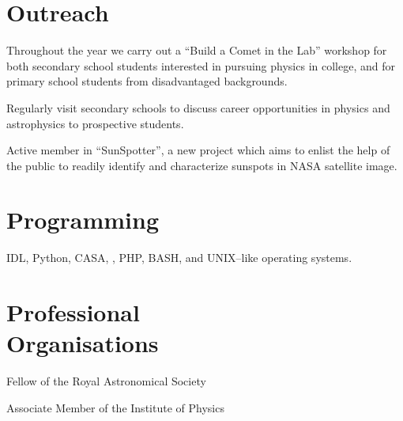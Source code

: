 \documentclass[margin,line]{resume}
\begin{document}
\begin{resume}
    \vspace{4mm}
    \section{\mysidestyle Outreach}

	\begin{list2}
    \item Throughout the year we carry out a ``Build a Comet in the Lab'' workshop for both secondary school students interested in pursuing physics in college, and for primary school students from disadvantaged backgrounds.
    \item Regularly visit secondary schools to discuss career opportunities in physics and astrophysics to prospective students.
        \item Active member in ``SunSpotter'', a new project which aims to enlist the help of the public to readily identify and characterize sunspots in NASA satellite image.\vspace{-1mm}\\%
    \end{list2}


    \vspace{4mm}
    \section{\mysidestyle Programming} 

    IDL, Python, CASA, \LaTeXe, PHP, BASH, and UNIX--like operating systems.


    \vspace{4mm}
    \section{\mysidestyle Professional\\Organisations} 
	\begin{list2}
    \item Fellow of the Royal Astronomical Society
    \item Associate Member of the Institute of Physics \vspace{-1mm}\\%
    \end{list2}
    

\end{resume}
\end{document}
